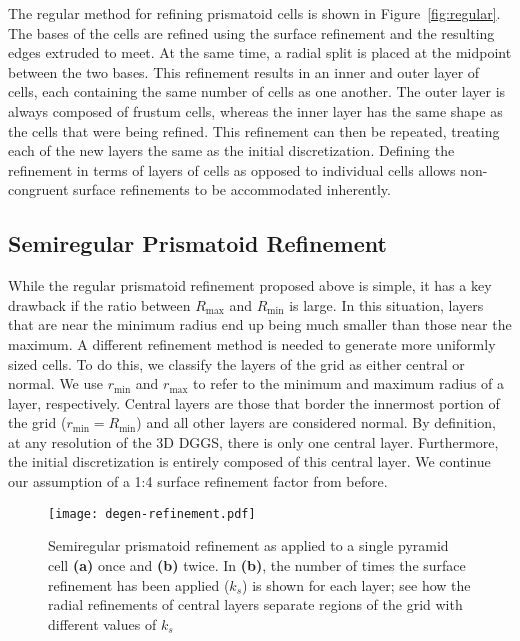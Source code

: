 The regular method for refining prismatoid cells is shown in Figure~\ref{fig:regular}.
The bases of the cells are refined using the surface refinement and the resulting edges extruded to meet.
At the same time, a radial split is placed at the midpoint between the two bases.
This refinement results in an inner and outer layer of cells, each containing the same number of cells as one another.
The outer layer is always composed of frustum cells, whereas the inner layer has the same shape as the cells that were being refined.
This refinement can then be repeated, treating each of the new layers the same as the initial discretization.
Defining the refinement in terms of layers of cells as opposed to individual cells allows non-congruent surface refinements to be accommodated inherently.


\subsection{Semiregular Prismatoid Refinement} \label{sec:grid:degen}
While the regular prismatoid refinement proposed above is simple, it has a key drawback if the ratio between $R_\mathrm{max}$ and $R_\mathrm{min}$ is large.
In this situation, layers that are near the minimum radius end up being much smaller than those near the maximum.
A different refinement method is needed to generate more uniformly sized cells.
To do this, we classify the layers of the grid as either central or normal.
We use $r_\mathrm{min}$ and $r_\mathrm{max}$ to refer to the minimum and maximum radius of a layer, respectively.
Central layers are those that border the innermost portion of the grid ($r_\mathrm{min} = R_\mathrm{min}$) and all other layers are considered normal.
By definition, at any resolution of the 3D DGGS, there is only one central layer.
Furthermore, the initial discretization is entirely composed of this central layer.
We continue our assumption of a 1:4 surface refinement factor from before.


\begin{figure}[h]
	\centering
	\texttt{[image: degen-refinement.pdf]}
	\caption{Semiregular prismatoid refinement as applied to a single pyramid cell \textbf{(a)} once and \textbf{(b)} twice.
		In \textbf{(b)}, the number of times the surface refinement has been applied ($k_s$) is shown for each layer; see how the radial refinements of central layers separate regions of the grid with different values of $k_s$}
	\label{fig:semiregular}
\end{figure}


